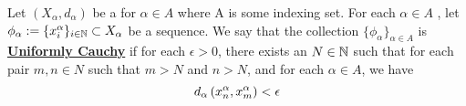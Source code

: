 \label{def:uniformlycauchy}
\newcommand{\UniformlyCauchy}[0]{\textbf{\hyperref[def:uniformlycauchy]{Uniformly Cauchy}}\xspace}
\begin{df}
	Let $(X_\alpha, d_\alpha)$ be a \PseudometricSpace
	for $\alpha \in A$ where A is some indexing set. 
	For each $\alpha \in A$
	, let $\phi_\alpha :=\{x_i^\alpha\}_{i \in \mathbb{N}} \subset X_{\alpha}$
	be a sequence. 
	We say that the collection $\{\phi_\alpha\}_{\alpha \in A}$ 
	is 
	\UniformlyCauchy if for each $\epsilon > 0$, there exists an 
	$N \in \mathbb{N}$ such that for each pair $m,n \in N$
	such that $m>N$ and $n>N$, and for each $\alpha \in A$, 
	we have 
	\begin{equation}
	d_{\alpha} \left( x^{\alpha}_n, x^{\alpha}_m\right) < \epsilon
	\end{equation}
\end{df}
